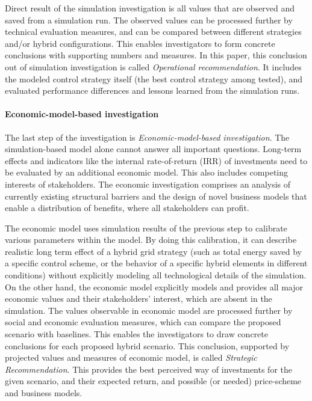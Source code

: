 \documentclass[review]{elsarticle}
\begin{document}
Direct result of the simulation investigation is all values that 
are observed and saved from a simulation run. The observed values can
be processed further by technical evaluation measures, and can be
compared between different strategies and/or hybrid configurations. 
This enables investigators to form concrete conclusions with
supporting numbers and measures. In this paper, this conclusion out of
simulation investigation is called {\em Operational recommendation}. 
It includes the modeled control strategy itself (the best control
strategy among tested), and evaluated performance differences and
lessons learned from the simulation runs. 

\paragraph{Economic-model-based investigation}
The last step of the investigation is {\em Economic-model-based 
  investigation}. 
The simulation-based model alone cannot answer all important
questions. Long-term effects and indicators like the internal
rate-of-return (IRR) of investments need to be evaluated by an
additional economic model.   
This also includes competing interests of stakeholders. 
The economic investigation comprises an analysis of currently existing
structural barriers and the design of novel business models that
enable a distribution of benefits, where all stakeholders can profit.  

The economic model uses simulation results of the previous step
to calibrate various parameters within the model. 
By doing this calibration, it can describe realistic long term effect
of a hybrid grid strategy (such as total energy saved by a specific
control scheme, or the behavior of a specific hybrid elements in
different conditions) without explicitly modeling all technological
details of the simulation. 
On the other hand, the economic model explicitly models and provides
all major economic values and their stakeholders' interest, which are  
absent in the simulation. The values observable in economic model are
processed further by social and economic evaluation measures, which
can compare the proposed scenario with baselines. 
This enables the investigators to draw concrete conclusions for each 
proposed hybrid scenario. This conclusion, supported by projected
values and measures of economic model, is called {\em Strategic
Recommendation}. 
This provides the best perceived way of investments for the given
scenario, and their expected return, and possible (or needed)
price-scheme and business models.    
\end{document}
